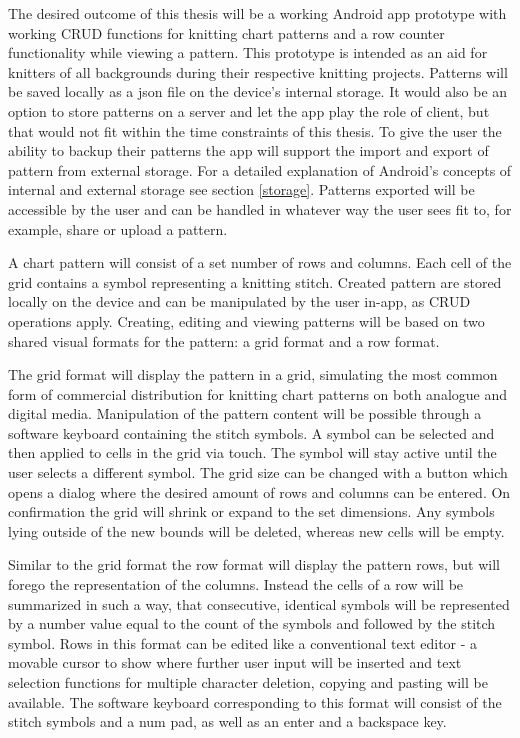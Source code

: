 The desired outcome of this thesis will be a working Android app prototype with working CRUD functions for knitting chart patterns and a row counter functionality while viewing a pattern. This prototype is intended as an aid for knitters of all backgrounds during their respective knitting projects. Patterns will be saved locally as a \gls{json} file on the device's internal storage. It would also be an option to store patterns on a server and let the app play the role of client, but that would not fit within the time constraints of this thesis. To give the user the ability to backup their patterns the app will support the import and export of pattern from external storage. For a detailed explanation of Android's concepts of internal and external storage see section \ref{storage}. Patterns exported will be accessible by the user and can be handled in whatever way the user sees fit to, for example, share or upload a pattern.

A chart pattern will consist of a set number of rows and columns. Each cell of the grid contains a symbol representing a knitting stitch. Created pattern are stored locally on the device and can be manipulated by the user in-app, as CRUD operations apply. Creating, editing and viewing patterns will be based on two shared visual formats for the pattern: a grid format and a row format.

The grid format will display the pattern in a grid, simulating the most common form of commercial distribution for knitting chart patterns on both analogue and digital media. Manipulation of the pattern content will be possible through a software keyboard containing the stitch symbols. A symbol can be selected and then applied to cells in the grid via touch. The symbol will stay active until the user selects a different symbol. The grid size can be changed with a button which opens a dialog where the desired amount of rows and columns can be entered. On confirmation the grid will shrink or expand to the set dimensions. Any symbols lying outside of the new bounds will be deleted, whereas new cells will be empty.

Similar to the grid format the row format will display the pattern rows, but will forego the representation of the columns. Instead the cells of a row will be summarized in such a way, that consecutive, identical symbols will be represented  by a number value equal to the count of the symbols and followed by the stitch symbol. Rows in this format can be edited like a conventional text editor - a movable cursor to show where further user input will be inserted and text selection functions for multiple character deletion, copying and pasting will be available. The software keyboard corresponding to this format will consist of the stitch symbols and a num pad, as well as an enter and a backspace key.

